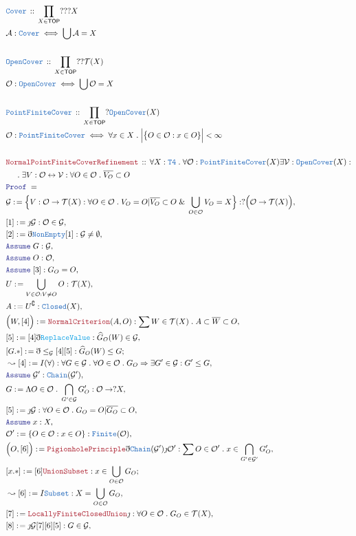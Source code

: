 \documentclass[12pt]{scrartcl}
\newcommand{\TYPE}[1]{\textcolor{NavyBlue}{\mathtt{#1}}}
\newcommand{\FUNC}[1]{\textcolor{Cerulean}{\mathtt{#1}}}
\newcommand{\LOGIC}[1]{\textcolor{Blue}{\mathtt{#1}}}
\newcommand{\THM}[1]{\textcolor{Maroon}{\mathtt{#1}}}
\renewcommand{\.}{\; . \;}
\newcommand{\de}{: \kern 0.1pc =}
\newcommand{\Theorem}[2]{& \THM{#1} \, :: \, #2 \\ & \Proof = \\ }
\newcommand{\DeclareType}[2]{& \TYPE{#1} \, :: \, #2 \\}
\newcommand{\DefineType}[3]{& #1 : \TYPE{#2} \iff #3 \\}
\newcommand{\NewLine}{\\ & \kern 1pc}
\newcommand{\Page}[1]{ \begin{align*} #1 \end{align*}   }
\newcommand{ \bd }{ \ByDef }
\renewcommand{\And}{\; \& \;}
\newcommand{\Imply}{\Rightarrow}
\newcommand{\ToBij}{\leftrightarrow}
\renewcommand{\c}{\complement}
\newcommand{\Say}[3]{& #1 \de #2 : #3, \\}
\newcommand{\Conclude}[3]{& #1 \de #2 : #3; \\}
\newcommand{\Derive}[3]{& \leadsto #1 \de #2 : #3, \\}
\newcommand{\Assume}[2]{& \LOGIC{Assume} \; #1 : #2, \\}
\newcommand{\ByDef}{\eth}
\newcommand{\ByConstr}{\jmath}
\newcommand{\Proof}{\LOGIC{Proof} \; }
\newcommand{\A}{\mathcal{A}}
\newcommand{\TOP}{\mathsf{TOP}}
\newcommand{\T}{\mathcal{T}}
\renewcommand{\O}{\mathcal{O}}
\begin{document}
\Page{
	\DeclareType{Cover}{\prod_{X \in \TOP} ???X  }
	\DefineType{\A}{Cover}{\bigcup \A = X}
	\\
	\DeclareType{OpenCover}{\prod_{X \in \TOP} ??\T(X)  }
	\DefineType{\mathcal{O}}{OpenCover}{\bigcup \mathcal{O} = X}	
	\\
	\DeclareType{PointFiniteCover}{\prod_{X \in \TOP} ?\TYPE{OpenCover}(X)  }
	\DefineType{\mathcal{O}}{PointFiniteCover}
	{\forall x \in X \. \Big|\big\{ O \in \mathcal{O} : x \in O \}\Big| < \infty }
	\\
	\Theorem{NormalPointFiniteCoverRefinement}
	{
		\forall X :\TYPE{T4} \.
		\forall \mathcal{O} : \TYPE{PointFiniteCover}(X)
		\exists \mathcal{V} : \TYPE{OpenCover}(X) : 
		\NewLine \. 
		\exists V : \mathcal{O} \ToBij \mathcal{V} :
		\forall O \in \mathcal{O} \.
		\overline{V_O} \subset O
	}
	\Say{\mathcal{G}}
	{
		\Big\{
			V : \mathcal{O} \to \T(X) : \forall O \in \mathcal{O} \. V_O = O | \overline{V_O}  \subset O  \And
			\bigcup_{O \in \O} V_O = X
		\Big\}
	}
	{
		?\Big(\O \to \T(X)\Big)
	}
	\Say{[1]}{\ByConstr \mathcal{G}}{\O \in \mathcal{G} }
	\Say{[2]}{\bd \TYPE{NonEmpty}[1]}{ \mathcal{G} \neq \emptyset}
	\Assume{G}{\mathcal{G}}
	\Assume{O}{\O}
	\Assume{[3]}{G_O = O}
	\Say{U}{\bigcup_{V \in \O : V \neq O} O}{\T(X)}
	\Say{A}{U^\c}{\TYPE{Closed}(X)}
	\Say{\Big( W,[4]\Big)}{\THM{NormalCriterion}(A,O)}
	{
		\sum  W \in \T(X) \.
		A \subset \overline{W} \subset O
	}
	\Say{[5]}{[4]\bd \FUNC{ReplaceValue} }{\widehat{G}_O(W) \in \mathcal{G}}
	\Conclude{[G.*]}{\bd \le_\mathcal{G} [4][5]}{ \widehat{G}_O(W) \le G  }
	\Derive{[4]}{I(\forall)}
	{
		\forall  G \in \mathcal{G} \. \forall O \in \O \.
		G_O \Imply \exists G' \in \mathcal{G} : G' \le G
	}
	\Assume{\mathcal{G}'}{\TYPE{Chain}(\mathcal{G}')}
	\Say{G}{\Lambda O \in \O \. \bigcap_{G' \in \mathcal{G}} G'_O}
	{
		\O \to ?X
	}
	\Say{[5]}{\ByConstr \mathcal{G} }{\forall O \in \O \. G_O = O | \overline{G_O} \subset O}
	\Assume{x}{X}
	\Say{\O'}{\{ O \in \O : x \in O  \}}{\TYPE{Finite}(\O)}  
	\Say{\Big(O, [6]\Big)}{\THM{PigionholePrinciple}\bd \TYPE{Chain}(\mathcal{G}')\ByConstr \O'}
	{
		\sum O \in \O' \. x \in \bigcap_{G' \in \mathcal{G}'} G'_O
	}
	\Conclude{[x.*]}{ [6] \THM{UnionSubset}}{ x \in \bigcup_{O \in \O} G_O}
	\Derive{[6]}{ I \TYPE{Subset}  }{ X =  \bigcup_{O \in \O} G_O    }
	\Say{[7]}{\THM{LocallyFiniteClosedUnion}\ByConstr }
	{  \forall O  \in \O \. G_O \in \T(X)  }
	\Say{[8]}{\ByConstr \mathcal{G} [7][6][5]}
	{
		G \in \mathcal{G}
	}
}
\end{document}
